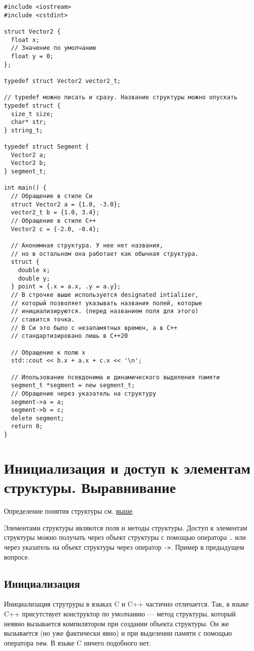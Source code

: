 \begin{verbatim}
#include <iostream>
#include <cstdint>

struct Vector2 {
  float x;
  // Значение по умолчанию
  float y = 0;
};

typedef struct Vector2 vector2_t;

// typedef можно писать и сразу. Название структуры можно опускать
typedef struct {
  size_t size;
  char* str;
} string_t;

typedef struct Segment {
  Vector2 a;
  Vector2 b;
} segment_t;

int main() {
  // Обращение в стиле Си
  struct Vector2 a = {1.0, -3.0};
  vector2_t b = {1.0, 3.4};
  // Обращение в стиле C++
  Vector2 c = {-2.0, -0.4};

  // Анонимная структура. У нее нет названия,
  // но в остальном она работает как обычная структура.
  struct {
    double x;
    double y;
  } point = {.x = a.x, .y = a.y};
  // В строчке выше используется designated intializer,
  // который позволяет указывать названия полей, которые
  // инициализируются. (перед названием поля для этого)
  // ставится точка.
  // В Си это было с незапамятных времен, а в C++
  // стандартизировано лишь в C++20

  // Обращение к полю x
  std::cout << b.x + a.x + c.x << '\n';
  
  // Ипользование псевдонима и динамического выделения памяти
  segment_t *segment = new segment_t;
  // Обращение через указатель на структуру
  segment->a = a;
  segment->b = c;
  delete segment;
  return 0;
}
\end{verbatim}

\section{Инициализация и доступ к элементам структуры. Выравнивание}
Определение понятия структуры см. \hyperref[def:struct]{выше}.

Элементами структуры являются поля и методы структуры.
Доступ к элементам структуры можно получать через объект структуры
с помощью оператора \verb|.| или через указатель на объект структуры через оператор \verb|->|.
Пример в предыдущем вопросе.

\subsection*{Инициализация}

Инициализация струтруры в языках C и C++ частично отличается. Так, в языке C++
присутствует конструктор по умолчанию --- метод структуры, который неявно
вызывается компилятором при создании объекта структуры. Он же вызывается (но
уже фактически явно) и при выделении памяти с помощью оператора \verb|new|.
В языке C ничего подобного нет.

